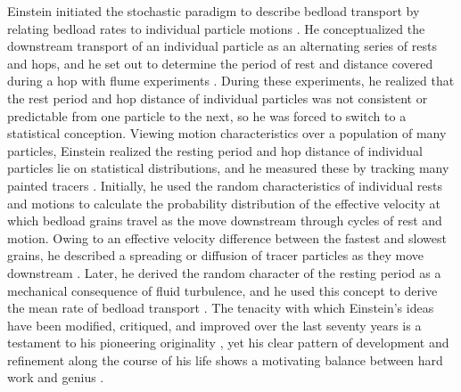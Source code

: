 \documentclass{article}
\begin{document}
Einstein initiated the stochastic paradigm to describe bedload transport by relating bedload rates to individual particle motions \citep{Einstein1942, Einstein1950}.
He conceptualized the downstream transport of an individual particle as an alternating series of rests and hops, and he set out to determine the period of rest and distance covered during a hop with flume experiments \citep{Einstein1937}. 
During these experiments, he realized that the rest period and hop distance of individual particles was not consistent or predictable from one particle to the next, so he was forced to switch to a statistical conception. 
Viewing motion characteristics over a population of many particles, Einstein realized the resting period and hop distance of individual particles lie on statistical distributions, and he measured these by tracking many painted tracers \citep{Einstein1937}. 
Initially, he used the random characteristics of individual rests and motions to calculate the probability distribution of the effective velocity at which bedload grains travel as the move downstream through cycles of rest and motion. 
Owing to an effective velocity difference between the fastest and slowest grains, he described a spreading or diffusion of tracer particles as they move downstream \citep{Einstein1937}. 
Later, he derived the random character of the resting period as a mechanical consequence of fluid turbulence, and he used this concept to derive the mean rate of bedload transport \citep{Einstein1950}. 
The tenacity with which Einstein's ideas have been modified, critiqued, and improved over the last seventy years is a testament to his pioneering originality \citep{Ettema2004}, yet his clear pattern of development and refinement along the course of his life shows a motivating balance between hard work and genius \citep{Einstein1937, Einstein1942, Einstein1950, Einstein1964}. 
\end{document}

